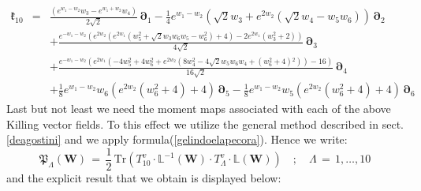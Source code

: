 \documentclass[10pt,a4paper]{article}
\newcommand{\ft}[2]{{\textstyle\frac{#1}{#2}}}
\begin{document}
\begin{eqnarray}
 \label{Kilvecu1}
  \boldsymbol{\mathfrak{k}}_{10} &=& \frac{\left(e^{w_1-w_2} w_3-e^{w_1+w_2} w_4\right) }{2 \sqrt{2}}\, \boldsymbol{\partial}_1-\frac{1}{4}
   e^{w_1-w_2} \left(\sqrt{2} w_3+e^{2 w_2} \left(\sqrt{2} w_4-w_5 w_6\right)\right)
   \, \boldsymbol{\partial}_2\nonumber\\
   &&+\frac{e^{-w_1-w_2} \left(e^{2 w_2} \left(e^{2 w_1} \left(w_5^2+\sqrt{2}
   w_3 w_6 w_5-w_6^2\right)+4\right)-2 e^{2 w_1} \left(w_3^2+2\right)\right)
   }{4 \sqrt{2}}\, \boldsymbol{\partial}_3\nonumber\\
   &&+\frac{e^{-w_1-w_2} \left(e^{2 w_1} \left(-4 w_5^2+4
   w_6^2+e^{2 w_2} \left(8 w_4^2-4 \sqrt{2} w_5 w_6
   w_4+\left(w_6^2+4\right){}^2\right)\right)-16\right) }{16
   \sqrt{2}}\, \boldsymbol{\partial}_4\nonumber\\
   &&+\frac{1}{8} e^{w_1-w_2} w_6 \left(e^{2 w_2} \left(w_6^2+4\right)+4\right)
   \, \boldsymbol{\partial}_5-\frac{1}{8} e^{w_1-w_2} w_5 \left(e^{2 w_2}
   \left(w_6^2+4\right)+4\right) \, \boldsymbol{\partial}_6
\end{eqnarray}
Last but not least we need the moment maps associated with each of the above Killing vector fields. To this effect we utilize the general method described in sect.\ref{deagostini} and we apply formula(\ref{gelindoelapecora}). Hence we write:
\begin{equation}\label{carnedivenerdi}
  \boldsymbol{\mathfrak{P}}_\Lambda\left(\mathbf{W}\right) \, = \, \ft 12 \, \text{Tr} \left(T^v_{10} \cdot
  \mathbb{L}^{-1}(\mathbf{W})\cdot T^v_\Lambda \cdot \mathbb{L}(\mathbf{W}) \right) \quad ; \quad \Lambda \, = \, 1,\dots , 10
\end{equation}
and the explicit result that we obtain is displayed below:
\end{document}
